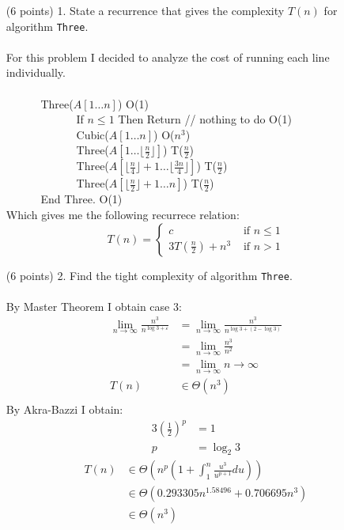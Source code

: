 \documentclass[paper=a4,fontsize=11pt]{article}
\begin{document}
\begin{enumerate}
\item [(6 points) 1.] State a recurrence that gives the complexity $T(n)$ for algorithm \texttt{Three}.\\\\
For this problem I decided to analyze the cost of running each line individually.\\
{\ttfamily
$\phantom{A}$\\
$\phantom{---}$ Three($A[1\dots n]$) O(1)\\
$\phantom{--- ---}$ If $n \leq 1$ Then Return // nothing to do O(1)\\
$\phantom{--- ---}$ Cubic($A[1\dots n]$) O($n^3$)\\
$\phantom{--- ---}$ Three($A[1\dots\lfloor\frac{n}{2}\rfloor]$) T($\frac{n}{2}$)\\
$\phantom{--- ---}$ Three($A[\lfloor\frac{n}{4}\rfloor+1\dots \lfloor\frac{3n}{4}\rfloor]$) T($\frac{n}{2}$)\\
$\phantom{--- ---}$ Three($A[\lfloor\frac{n}{2}\rfloor+1\dots n]$) T($\frac{n}{2}$)\\
$\phantom{---}$ End Three. O(1)
}\\
Which gives me the following recurrece relation:\\
\[
T(n) = \left\{
\begin{array}{cl}
c & \textrm{ if } n \leq 1\\
3T(\frac{n}{2}) + n^3 & \textrm{ if } n > 1
\end{array}
\right.
\]
\item [(6 points) 2.] Find the tight complexity of algorithm \texttt{Three}.\\\\
By Master Theorem I obtain case 3:\\
\begin{align*}
    \lim_{n\to\infty}{\frac{n^3}{n^{\log{3}+\varepsilon}}}&=\lim_{n\to\infty}{\frac{n^3}{n^{\log{3}+(2 - \log{3})}}}\\
    &=\lim_{n\to\infty}{\frac{n^3}{n^2}}\\
    &=\lim_{n\to\infty}{n}\rightarrow\infty\\
    T(n)&\in \Theta(n^{3})\\
\end{align*}
By Akra-Bazzi I obtain:
\begin{align*}
    3(\frac{1}{2})^{p}&=1\\
    p&=\log_{2}{3}
\end{align*}
\begin{align*}
    T(n) &\in \Theta(n^{p}(1+\int_{1}^{n}{\frac{u^{3}}{u^{p+1}}du}))\\
    &\in \Theta(0.293305 n^{1.58496}+0.706695 n^{3})\\
    &\in \Theta(n^{3})\\
\end{align*}
\end{enumerate}
\end{document}
